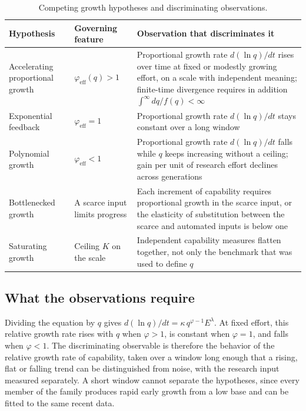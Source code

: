 \documentclass[11pt]{article}
\begin{document}
\begin{table}[h]
\centering
\small
\renewcommand{\arraystretch}{1.25}
\begin{tabular}{@{}p{}p{}p{}@{}}
\toprule
Hypothesis & Governing feature & Observation that discriminates it \\
\midrule
Accelerating proportional growth & $\varphi_{\mathrm{eff}}(q)>1$ & Proportional growth rate $d(\ln q)/dt$ rises over time at fixed or modestly growing effort, on a scale with independent meaning; finite-time divergence requires in addition $\int^{\infty}dq/f(q)<\infty$ \\
Exponential feedback & $\varphi_{\mathrm{eff}}=1$ & Proportional growth rate $d(\ln q)/dt$ stays constant over a long window \\
Polynomial growth & $\varphi_{\mathrm{eff}}<1$ & Proportional growth rate $d(\ln q)/dt$ falls while $q$ keeps increasing without a ceiling; gain per unit of research effort declines across generations \\
Bottlenecked growth & A scarce input limits progress & Each increment of capability requires proportional growth in the scarce input, or the elasticity of substitution between the scarce and automated inputs is below one \\
Saturating growth & Ceiling $K$ on the scale & Independent capability measures flatten together, not only the benchmark that was used to define $q$ \\
\bottomrule
\end{tabular}
\caption{Competing growth hypotheses and discriminating observations.}
\label{tab:models}
\end{table}

\subsection{What the observations require}

Dividing the equation by $q$ gives $d(\ln q)/dt=\kappa\, q^{\varphi-1}E^{\lambda}$. At fixed effort, this relative growth rate rises with $q$ when $\varphi>1$, is constant when $\varphi=1$, and falls when $\varphi<1$. The discriminating observable is therefore the behavior of the relative growth rate of capability, taken over a window long enough that a rising, flat or falling trend can be distinguished from noise, with the research input measured separately. A short window cannot separate the hypotheses, since every member of the family produces rapid early growth from a low base and can be fitted to the same recent data.
\end{document}
